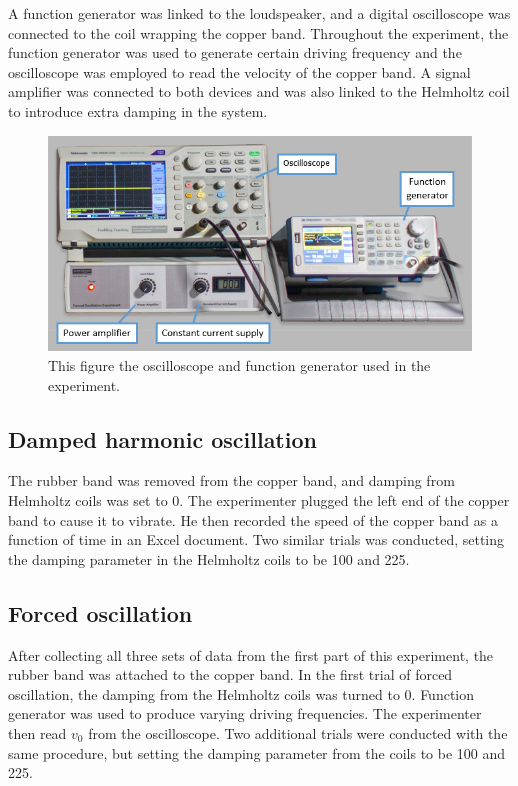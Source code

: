 \documentclass[a4paper,12pt]{article}
\begin{document}
A function generator was linked to the loudspeaker, and a digital oscilloscope was connected to the  coil wrapping the copper band. Throughout the experiment, the function generator was used to generate certain driving frequency and the oscilloscope was employed to read the velocity of the copper band. A signal amplifier was connected to both devices and was also linked to the Helmholtz coil to introduce extra damping in the system.
\begin{figure}[h]
	\centering
	\includegraphics[scale=0.4]{Images/Equipment-scopes-and-power-labelled.jpg}
	\caption{This figure \cite{Prelab} the oscilloscope and function generator used in the experiment.}
\end{figure} 
\subsection{Damped harmonic oscillation}
The rubber band was removed from the copper band, and damping from Helmholtz coils was set to \( 0 \). The experimenter plugged the left end of the copper band to cause it to vibrate. He then recorded the speed of the copper band as a function of time in an Excel document. Two similar trials was conducted, setting the damping parameter in the Helmholtz coils to be 100 and 225. 
\subsection{Forced oscillation}
After collecting all three sets of data from the first part of this experiment, the rubber band was attached to the copper band. In the first trial of forced oscillation, the damping from the Helmholtz coils was turned to  \(0 \). Function generator was used to produce varying driving frequencies. The experimenter then read \( v_0 \) from the oscilloscope. Two additional trials were conducted with the same procedure, but setting the damping parameter from the coils to be 100 and 225.
\end{document}

